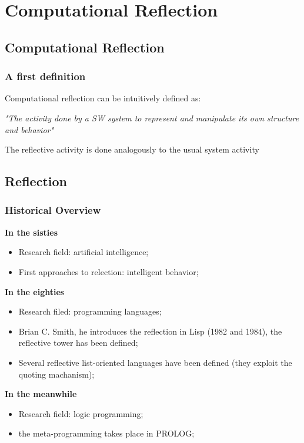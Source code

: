 \section{Computational Reflection}

\subsection{Computational Reflection}

\subsubsection{A first definition}

Computational reflection can be intuitively defined as:

\textit{"The activity done by a SW system to represent and manipulate its own structure and behavior"}

The reflective activity is done analogously to the usual system activity

\subsection{Reflection}

\subsubsection{Historical Overview}

\textbf{In the sisties}
\begin{itemize}
	\item Research field: artificial intelligence;
	\item First approaches to relection: intelligent behavior;
\end{itemize}

\textbf{In the eighties}
\begin{itemize}
	\item Research filed: programming languages;
	\item Brian C. Smith, he introduces the reflection in Lisp (1982 and 1984), the reflective tower has been defined;
	\item Several reflective list-oriented languages have been defined (they exploit the quoting machanism);
\end{itemize}

\textbf{In the meanwhile}
\begin{itemize}
	\item Research field: logic programming;
	\item the meta-programming takes place in PROLOG;
\end{itemize}

